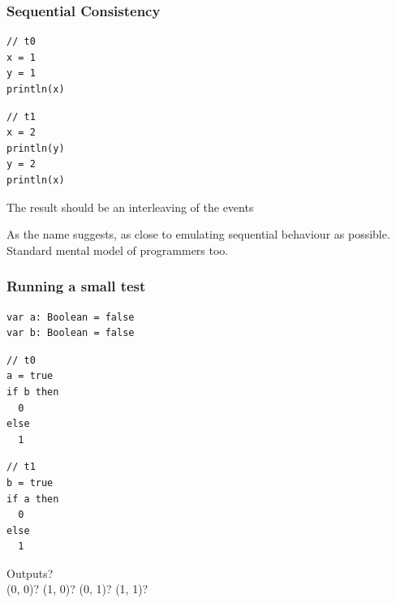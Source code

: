 \documentclass[aspectratio=1610, xcolor={dvipsnames}]{beamer}
\begin{document}
\begin{frame}[fragile]
    \frametitle{Sequential Consistency}

    \begin{multicols}{3}
\begin{lstlisting}
// t0
x = 1
y = 1
println(x)
\end{lstlisting}
\columnbreak
\begin{lstlisting}
// t1
x = 2
println(y)
y = 2
println(x)
\end{lstlisting}
\columnbreak

\pause
The result should be an interleaving of the events
    \end{multicols}

    \pause
    As the name suggests, as close to emulating sequential behaviour as
    possible. \pause Standard mental model of programmers too.

\end{frame}


\begin{frame}[fragile]
    \frametitle{Running a small test}

    \centering
    \begin{lstlisting}
var a: Boolean = false
var b: Boolean = false
    \end{lstlisting}

    \begin{multicols}{2}

        \begin{lstlisting}
// t0
a = true
if b then
  0
else 
  1
        \end{lstlisting}

        \columnbreak

        \begin{lstlisting}
// t1
b = true
if a then
  0
else 
  1
        \end{lstlisting}
        
    \end{multicols}

    Outputs? \\ \pause
    (0, 0)? \pause
    (1, 0)? \pause
    (0, 1)? \pause
    (1, 1)?
    

\end{frame}
\end{document}
